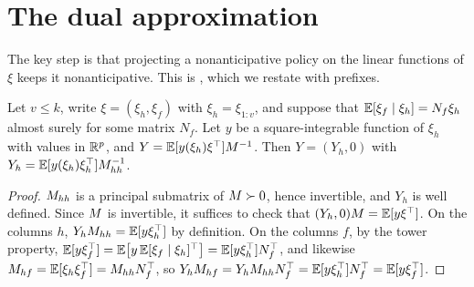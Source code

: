 \section{The dual approximation}
\label{app:dual}

The key step is that projecting a nonanticipative policy on the linear functions of $\xi$ keeps it nonanticipative.
This is \citet[Lemma~2]{KWG2011}, which we restate with prefixes.

\begin{lemma}
\label{lem:projection}
Let $v \le k$, write $\xi = (\xi_h, \xi_f)$ with $\xi_h = \xi_{1:v}$, and suppose that $\mathbb{E}[\xi_f \mid \xi_h] = N_f\xi_h$ almost surely for some matrix $N_f$.
Let $y$ be a square-integrable function of $\xi_h$ with values in $\mathbb{R}^p$, and $Y = \mathbb{E}[y(\xi_h)\xi^\top]M^{-1}$.
Then $Y = (Y_h, 0)$ with $Y_h = \mathbb{E}[y(\xi_h)\xi_h^\top]M_{hh}^{-1}$.
\end{lemma}

\begin{proof}
$M_{hh}$ is a principal submatrix of $M \succ 0$, hence invertible, and $Y_h$ is well defined.
Since $M$ is invertible, it suffices to check that $(Y_h, 0)M = \mathbb{E}[y\xi^\top]$.
On the columns $h$, $Y_hM_{hh} = \mathbb{E}[y\xi_h^\top]$ by definition.
On the columns $f$, by the tower property,
$\mathbb{E}[y\xi_f^\top] = \mathbb{E}\bigl[y\,\mathbb{E}[\xi_f\mid\xi_h]^\top\bigr] = \mathbb{E}[y\xi_h^\top]N_f^\top$,
and likewise $M_{hf} = \mathbb{E}[\xi_h\xi_f^\top] = M_{hh}N_f^\top$,
so $Y_hM_{hf} = Y_hM_{hh}N_f^\top = \mathbb{E}[y\xi_h^\top]N_f^\top = \mathbb{E}[y\xi_f^\top]$.
\end{proof}

